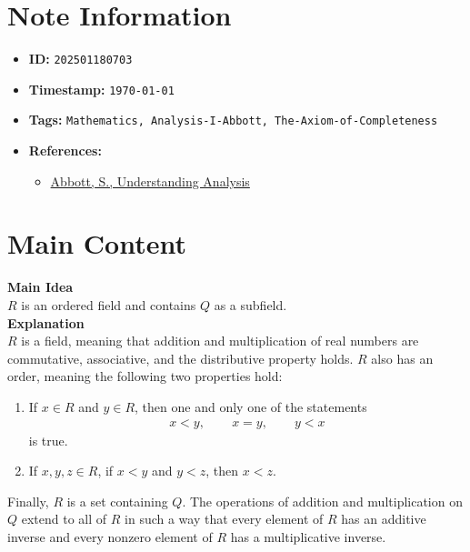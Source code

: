 \clearpage
{}
\label{202501180703}
\renewcommand{\notetitle}{Initial Definition for R}

\section*{Note Information}
\begin{itemize}
  \item \textbf{ID:} \texttt{202501180703}
  \item \textbf{Timestamp:} \texttt{\today \ \currenttime}
  \item \textbf{Tags:} \texttt{Mathematics, Analysis-I-Abbott, The-Axiom-of-Completeness}
  \item \textbf{References:}
    \begin{itemize}
      \item \href{/home/garrett/Personal/References/Mathematics/Analysis-I/Abbott.pdf}{Abbott, S., Understanding Analysis}
    \end{itemize}
\end{itemize}


\section*{Main Content}
\textbf{Main Idea}\\
$R$ is an ordered field and contains $Q$ as a subfield.\\

\textbf{Explanation}\\
$R$ is a field, meaning that addition and multiplication of real numbers are commutative, associative, and the distributive property holds. $R$ also has an order, meaning the following two properties hold:
\begin{enumerate}
  \item If $x \in R$ and $y \in R$, then one and only one of the statements
  \begin{align*}
    x < y, \hspace{25pt} x = y, \hspace{25pt} y < x
  \end{align*}
  is true.
\item If $x,y,z \in R$, if $x < y$ and $y < z$, then $x < z$. 
\end{enumerate}
Finally, $R$ is a set containing $Q$. The operations of addition and multiplication on $Q$ extend to all of $R$ in such a way that every element of $R$ has an additive inverse and every nonzero element of $R$ has a multiplicative inverse.\\

